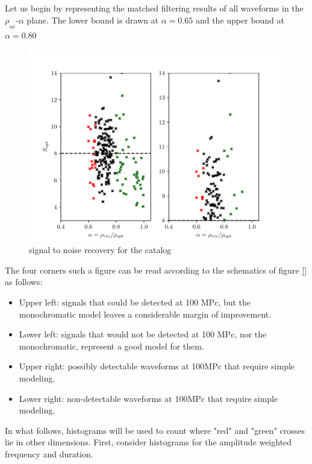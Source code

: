 Let us begin by representing the matched filtering results of all waveforms in the $\rho_{_{opt}}$-$\alpha$ plane. The lower bound is drawn at $\alpha=0.65$ and the upper bound at $\alpha=0.80$


\begin{figure}[hbt!]
\begin{center}
\includegraphics[width=\textwidth, angle=0]{images/Data_analysis/results/alpha_scatter.pdf}
\caption{signal to noise recovery for the catalog}
\label{ascatter}
\end{center}
\end{figure}

\FloatBarrier


The four corners such a figure can be read according to the schematics of figure \ref{} as follows:

\begin{itemize}
\item Upper left: signals that could be detected at 100 MPc, but the monochromatic model leaves a considerable margin of improvement.
\item Lower left: signals that would not be detected at 100 MPc, nor the monochromatic, represent a good model for them.
\item 
Upper right: possibly detectable waveforms at 100MPc that require simple modeling.
\item 
Lower right: non-detectable waveforms at 100MPc that require simple modeling.
\end{itemize}

\newpage

In what follows, histograms will be used to count where "red" and "green" crosses lie in other dimensions. First, consider histograms for the amplitude weighted frequency and duration.

